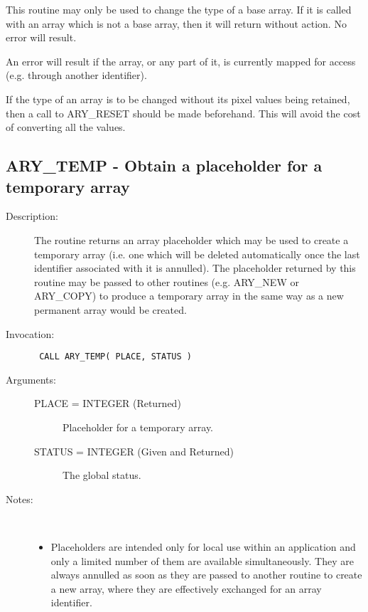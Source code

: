 \documentclass[twoside,11pt]{article}
\newcommand{\xlabel}[1]{}
\newlength{\sstbannerlength}
\newlength{\sstcaptionlength}
\newlength{\sstexampleslength}
\newlength{\sstexampleswidth}
\newcommand{\sstroutine}[3]{
   \goodbreak
   \rule{\textwidth}{0.5mm}
   \vspace{-7ex}
   \newline
   \settowidth{\sstbannerlength}{{\Large {\bf #1}}}
   \setlength{\sstcaptionlength}{\textwidth}
   \setlength{\sstexampleslength}{\textwidth}
   \addtolength{\sstbannerlength}{0.5em}
   \addtolength{\sstcaptionlength}{-2.0\sstbannerlength}
   \addtolength{\sstcaptionlength}{-5.0pt}
   \settowidth{\sstexampleswidth}{{\bf Examples:}}
   \addtolength{\sstexampleslength}{-\sstexampleswidth}
   \parbox[t]{\sstbannerlength}{\flushleft{\Large {\bf #1}}}
   \parbox[t]{\sstcaptionlength}{\center{\Large #2}}
   \parbox[t]{\sstbannerlength}{\flushright{\Large {\bf #1}}}
   \begin{description}
      #3
   \end{description}
}
\newcommand{\sstdescription}[1]{\item[Description:] #1}
\newcommand{\sstinvocation}[1]{\item[Invocation:]\hspace{0.4em}{\tt #1}}
\newcommand{\sstarguments}[1]{
   \item[Arguments:] \mbox{} \\
   \vspace{-3.5ex}
   \begin{description}
      #1
   \end{description}
}
\newcommand{\sstsubsection}[1]{ \item[{#1}] \mbox{} \\}
\newcommand{\sstnotes}[1]{\item[Notes:] \mbox{} \\[1.3ex] #1}
\newcommand{\sstitemlist}[1]{
  \mbox{} \\
  \vspace{-3.5ex}
  \begin{itemize}
     #1
  \end{itemize}
}
\newcommand{\sstitem}{\item}
\newcommand{\ssttt}{\tt}
\renewcommand{\sstroutine}[3]{
      \subsection{#1\xlabel{#1}-\label{#1}#2}
      \begin{description}
         #3
      \end{description}
   }
\renewcommand{\sstdescription}[1]{\item[Description:]
      \begin{description}
         #1
      \end{description}
   }
\renewcommand{\sstinvocation}[1]{\item[Invocation:]
      \begin{description}
         {\ssttt #1}
      \end{description}
   }
\renewcommand{\sstarguments}[1]{
      \item[Arguments:]
      \begin{description}
         #1
      \end{description}
   }
\renewcommand{\sstsubsection}[1]{\item[{#1}]}
\renewcommand{\sstnotes}[1]{\item[Notes:]
      \begin{description}
         #1
      \end{description}
   }
\newcommand{\sstitemlist}[1]{
      \begin{itemize}
         #1
      \end{itemize}
   }
\begin{document}
\begin{eqn*}
{{{         \sstitem
         This routine may only be used to change the type of a base
         array. If it is called with an array which is not a base array,
         then it will return without action. No error will result.

         \sstitem
         An error will result if the array, or any part of it, is
         currently mapped for access (e.g. through another identifier).

         \sstitem
         If the type of an array is to be changed without its pixel
         values being retained, then a call to ARY\_RESET should be made
         beforehand. This will avoid the cost of converting all the
         values.
      }
   }
}
\sstroutine{
   ARY\_TEMP
}{
   Obtain a placeholder for a temporary array
}{
   \sstdescription{
      The routine returns an array placeholder which may be used to
      create a temporary array (i.e. one which will be deleted
      automatically once the last identifier associated with it is
      annulled). The placeholder returned by this routine may be passed
      to other routines (e.g. ARY\_NEW or ARY\_COPY) to produce a
      temporary array in the same way as a new permanent array would be
      created.
   }
   \sstinvocation{
      CALL ARY\_TEMP( PLACE, STATUS )
   }
   \sstarguments{
      \sstsubsection{
         PLACE = INTEGER (Returned)
      }{
         Placeholder for a temporary array.
      }
      \sstsubsection{
         STATUS = INTEGER (Given and Returned)
      }{
         The global status.
      }
   }
   \sstnotes{
      \sstitemlist{

         \sstitem
         Placeholders are intended only for local use within an
         application and only a limited number of them are available
         simultaneously. They are always annulled as soon as they are
         passed to another routine to create a new array, where they are
         effectively exchanged for an array identifier.

}}}
\end{eqn*}
\end{document}
